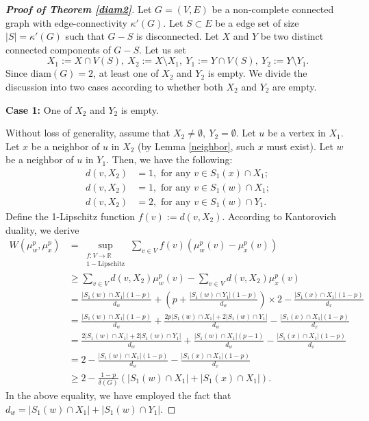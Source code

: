 \documentclass[11pt,bezier]{article}
\theoremstyle{definition}
\theoremstyle{definition}
\theoremstyle{nonumber}
\newtheorem*{theorem*}{Theorem}
\begin{document}

\begin{proof}[\bf{Proof of Theorem \ref{diam2}}]
Let $G=(V,E)$ be a non-complete connected graph with edge-connectivity $\kappa'(G)$. Let $S \subset E$ be a edge set of size $|S| = \kappa'(G)$ such that $G - S$ is disconnected. Let $X$ and $Y$ be two distinct connected components of $G - S$.
Let us set
$$
X_1:=X\cap V(S),\ X_2:=X \setminus X_1,\ Y_1:=Y\cap V(S),\ Y_2:=Y \setminus Y_1.
$$
Since $\mathrm{diam}(G)=2$, at least one of $X_2$ and $Y_2$ is empty. We divide the discussion into two cases according to whether both $X_2$ and $Y_2$ are empty.

\textbf{Case 1:} One of $X_2$ and $Y_2$ is empty.

Without loss of generality, assume that $X_2\ne\emptyset,\ Y_2=\emptyset$.
Let $u$ be a vertex in $X_1$. Let $x$ be a neighbor of $u$ in $X_2$ (by Lemma \ref{neighbor}, such $x$ must exist). Let $w$ be a neighbor of $u$ in $Y_1$. Then, we have the following:
\begin{align*} 
d(v, X_2) &= 1, \text{ for any } v \in S_1(x) \cap X_1;\\
d(v, X_2) &= 1, \text{ for any } v \in S_1(w) \cap X_1;\\
d(v, X_2) &= 2, \text{ for any } v \in S_1(w) \cap Y_1.
\end{align*}
Define the 1-Lipschitz function $f(v):=d(v, X_2)$. According to Kantorovich duality, we derive
\begin{align*}
W(\mu_w^p, \mu_x^p) &= \sup_{\substack{f: V \to \mathbb{R} \\ 1-\text{Lipschitz}}} \sum_{v \in V} f(v) \left( \mu_w^p(v) - \mu_x^p(v) \right)\\
&\geq \sum_{v \in V} d(v, X_2) \mu_w^p(v) - \sum_{v \in V} d(v, X_2) \mu_x^p(v)\\
&= \frac{|S_1(w) \cap X_1|(1-p)}{d_w} + \left( p + \frac{|S_1(w) \cap Y_1|(1-p)}{d_w} \right) \times 2 - \frac{|S_1(x) \cap X_1|(1-p)}{d_x}\\
&= \frac{|S_1(w) \cap X_1|(1-p)}{d_w} +  \frac{2p|S_1(w) \cap X_1|+2|S_1(w) \cap Y_1|}{d_w} - \frac{|S_1(x) \cap X_1|(1-p)}{d_x}\\
&= \frac{2|S_1(w) \cap X_1|+2|S_1(w) \cap Y_1|}{d_w} +  \frac{|S_1(w) \cap X_1|(p-1)}{d_w} - \frac{|S_1(x) \cap X_1|(1-p)}{d_x}\\
&= 2 - \frac{|S_1(w) \cap X_1|(1-p)}{d_w} - \frac{|S_1(x) \cap X_1|(1-p)}{d_x}\\
&\geq 2 - \frac{1-p}{\delta(G)} \left( |S_1(w) \cap X_1| + |S_1(x) \cap X_1| \right).
\end{align*}
In the above equality, we have employed the fact that $d_w = |S_1(w) \cap X_1| + |S_1(w) \cap Y_1|$.


\end{proof}
\end{document}
